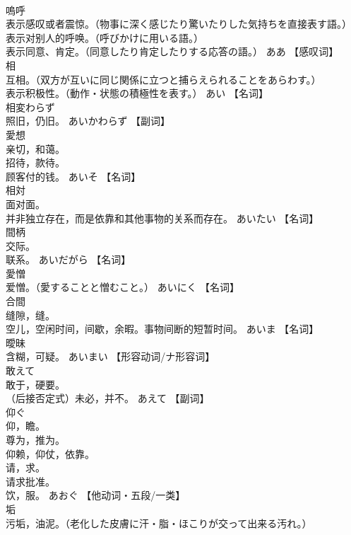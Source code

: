 \documentclass[8pt]{extreport}
\begin{document}
\begin{CJK}{UTF8}{min}
\\	嗚呼	
\\	表示感叹或者震惊。（物事に深く感じたり驚いたりした気持ちを直接表す語。） 
\\	表示对别人的呼唤。（呼びかけに用いる語。） 
\\	表示同意、肯定。（同意したり肯定したりする応答の語。）	ああ		【感叹词】
\\	相	
\\	互相。（双方が互いに同じ関係に立つと捕らえられることをあらわす。） 
\\	表示积极性。（動作・状態の積極性を表す。）	あい		【名词】
\\	相変わらず	
\\	照旧，仍旧。	あいかわらず		【副词】
\\	愛想	
\\	亲切，和蔼。 
\\	招待，款待。 
\\	顾客付的钱。	あいそ		【名词】
\\	相対	
\\	面对面。 
\\	并非独立存在，而是依靠和其他事物的关系而存在。	あいたい		【名词】
\\	間柄	
\\	交际。 
\\	联系。	あいだがら		【名词】
\\	愛憎	
\\	爱憎。（愛することと憎むこと。）	あいにく		【名词】
\\	合間	
\\	缝隙，缝。 
\\	空儿，空闲时间，间歇，余暇。事物间断的短暂时间。	あいま		【名词】
\\	曖昧	
\\	含糊，可疑。	あいまい		【形容动词/ナ形容词】
\\	敢えて	
\\	敢于，硬要。 
\\	（后接否定式）未必，并不。	あえて		【副词】
\\	仰ぐ	
\\	仰，瞻。 
\\	尊为，推为。 
\\	仰赖，仰仗，依靠。 
\\	请，求。 
\\	请求批准。 
\\	饮，服。	あおぐ		【他动词・五段/一类】
\\	垢	
\\	污垢，油泥。（老化した皮膚に汗・脂・ほこりが交って出来る汚れ。） 

\end{CJK}
\end{document}
